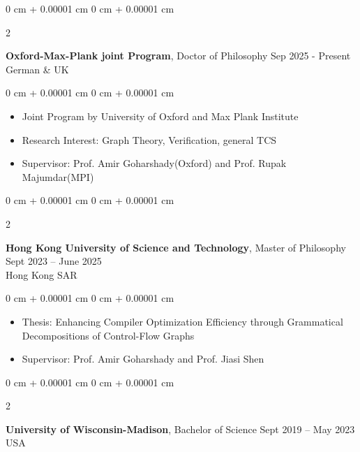 \documentclass[10pt, letterpaper]{article}
\newenvironment{highlights}{
    \begin{itemize}[
        topsep=0.10 cm,
        parsep=0.10 cm,
        partopsep=0pt,
        itemsep=0pt,
        leftmargin=0 cm + 10pt
    ]
}{
    \end{itemize}
} %
\newenvironment{onecolentry}{
    \begin{adjustwidth}{
        0 cm + 0.00001 cm
    }{
        0 cm + 0.00001 cm
    }
}{
    \end{adjustwidth}
} %
\newenvironment{twocolentry}[2][]{
    \onecolentry
    \def\secondColumn{#2}
    \setcolumnwidth{\fill, 4.5 cm}
    \begin{paracol}{2}
}{
    \switchcolumn \raggedleft \secondColumn
    \end{paracol}
    \endonecolentry
} %
\begin{document}
     \begin{twocolentry}{
            Sep 2025 - Present\\
            German \& UK
        }
            \textbf{Oxford-Max-Plank joint Program}, Doctor of Philosophy\end{twocolentry}

        \vspace{0.10 cm}
        \begin{onecolentry}
            \begin{highlights}
                \item Joint Program by University of Oxford and Max Plank Institute
                \item Research Interest: Graph Theory, Verification, general TCS
                \item Supervisor: Prof. Amir Goharshady(Oxford) and Prof. Rupak Majumdar(MPI)
            \end{highlights}
        \end{onecolentry}
        \vspace{0.2 cm}

    \begin{twocolentry}{
            Sept 2023 – June 2025\\
            Hong Kong SAR
        }
            \textbf{Hong Kong University of Science and Technology}, Master of Philosophy\end{twocolentry}

        \vspace{0.10 cm}
        \begin{onecolentry}
            \begin{highlights}
                \item Thesis: Enhancing Compiler Optimization Efficiency through Grammatical Decompositions of Control-Flow Graphs
                \item Supervisor: Prof. Amir Goharshady and Prof. Jiasi Shen
            \end{highlights}
        \end{onecolentry}
        \vspace{0.2 cm}
        
        \begin{twocolentry}{
            Sept 2019 – May 2023\\
            USA
        }
            \textbf{University of Wisconsin-Madison}, Bachelor of Science\end{twocolentry}
\end{document}
